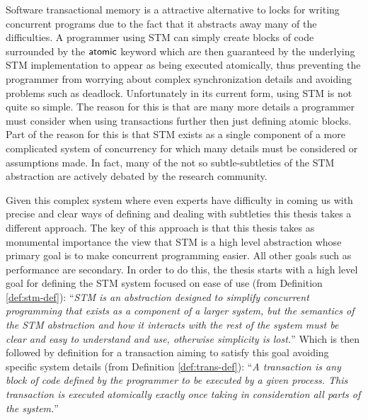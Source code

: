 Software transactional memory is a attractive alternative to locks for writing concurrent programs
due to the fact that it abstracts away many of the difficulties.
A programmer using STM can simply create blocks of code surrounded by the $\act{atomic}$
keyword which are then guaranteed by the underlying STM implementation to appear
as being executed atomically,
thus preventing the programmer from worrying about complex synchronization details
and avoiding problems such as deadlock.
Unfortunately in its current form, using STM is not quite so simple.
The reason for this is that are many more details a programmer must consider when using transactions
further then just defining atomic blocks.
Part of the reason for this is that STM exists as a single component of a more complicated
system of concurrency for which many details must be considered or assumptions made.
In fact, many of the not so subtle-subtleties
of the STM abstraction are actively debated by the research community.

Given this complex system where even experts have difficulty in coming us with precise
and clear ways of defining and dealing with
subtleties this thesis takes a different approach.
The key of this approach is that this thesis takes as monumental importance
the view that STM is a high level abstraction whose
primary goal is to make concurrent programming easier.
All other goals such as performance are secondary.
In order to do this, the thesis starts with a high level goal for defining the STM
system focused on ease of use (from Definition \ref{def:stm-def}):
``\emph{STM is an abstraction designed to simplify concurrent programming that exists as a component of a larger system,
but the semantics of the STM abstraction and how it interacts with the rest of the system must be clear and easy to understand and use,
otherwise simplicity is lost.}''
Which is then followed by definition for
a transaction aiming to satisfy this goal avoiding specific system details (from Definition \ref{def:trans-def}):
``\emph{A transaction is any block of
code defined by the programmer to be executed by a given process.
This transaction is executed atomically exactly once
taking in consideration all parts of the system.}''


